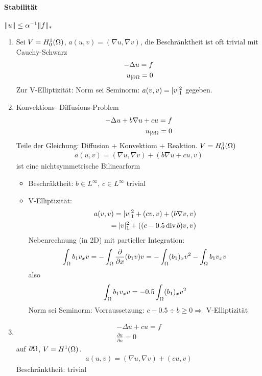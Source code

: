 \paragraph{Stabilität}$\|u\| \leq \alpha^{-1} \|f\|_*$
\begin{beispiel}
  \begin{enumerate}
  \item Sei $V = H_0^1(\Omega)$, $a(u, v) = (\nabla u, \nabla v)$, die Beschränktheit ist oft trivial mit Cauchy-Schwarz
    \begin{align*}
      - \Delta u = f \\
      u_{|\partial \Omega} = 0
    \end{align*}
    Zur V-Elliptizität: Norm sei Seminorm: $a(v, v) = |v|_1^2$ gegeben.
  \item Konvektions- Diffusions-Problem
    \begin{align*}
      -\Delta u + b \nabla u + c u = f\\
      u_{|\partial \Omega} = 0
    \end{align*}
    Teile der Gleichung: Diffusion + Konvektiom + Reaktion. $V = H_0^1(\Omega)$
    \begin{align*}
      a(u, v) = (\nabla u, \nabla v) + (b \nabla u + c u, v)
    \end{align*}
    ist eine nichtsymmetrische Bilinearform
    \begin{itemize}
    \item Beschräktheit: $b \in L^\infty$, $c\in L^\infty$ trivial
    \item V-Elliptizität:
      \begin{align*}
        a(v, v) = |v| _1^2 + (cv, v) + (b \nabla v, v)\\
= |v|_1^2 + ((c- 0.5 \operatorname{div} b)v, v)
      \end{align*}
      Nebenrechnung (in 2D) mit partieller Integration: 
      \begin{align*}
        \int_\Omega b_1 v_x v = - \int_\Omega \frac{\partial}{\partial x}(b_1 v)v = - \int_\Omega (b_1)_xv^2 - \int_\Omega b_1 v_x v 
      \end{align*}
also
\begin{align*}
  \int_\Omega b_1 v_x v = -0.5 \int_\Omega (b_1)_xv^2
\end{align*}
Norm sei Seminorm: Vorraussetzung: $c - 0.5 \div b \geq 0 \Rightarrow$ V-Elliptizität 
    \end{itemize}
\item
  \begin{align*}
    - \Delta u + c u = f\\
\frac{\partial u}{\partial n} = 0 
  \end{align*}
auf $\partial \Omega$, $V = H^1(\Omega)$. 
\begin{align*}
  a(u, v) = (\nabla u, \nabla v) + (c u, v)
\end{align*}
Beschränktheit: trivial


\end{enumerate}
\end{beispiel}

